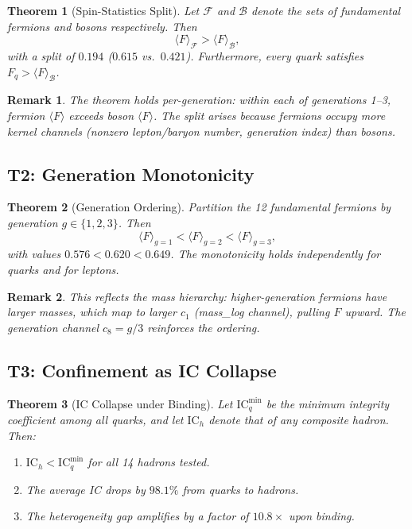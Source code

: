 \documentclass[
  aps,
  prd,
  twocolumn,
  superscriptaddress,
  nofootinbib,
  floatfix
]{revtex4-2}
\newtheorem{theorem}{Theorem}
\newtheorem{remark}{Remark}
\newcommand{\beq}{\begin{equation}}
\newcommand{\eeq}{\end{equation}}
\newcommand{\IC}{\mathrm{IC}}
\begin{document}
\begin{theorem}[Spin-Statistics Split]\label{thm:T1}
Let $\mathcal{F}$ and $\mathcal{B}$ denote the sets of
fundamental fermions and bosons respectively.  Then
\beq
  \langle F \rangle_{\mathcal{F}} > \langle F \rangle_{\mathcal{B}},
\eeq
with a split of $0.194$ ($0.615$ vs.\ $0.421$).  Furthermore,
every quark satisfies $F_q > \langle F \rangle_{\mathcal{B}}$.
\end{theorem}

\begin{remark}
The theorem holds per-generation: within each of generations 1--3,
fermion $\langle F \rangle$ exceeds boson $\langle F \rangle$.
The split arises because fermions occupy more kernel channels
(nonzero lepton/baryon number, generation index) than bosons.
\end{remark}

\subsection{T2: Generation Monotonicity}

\begin{theorem}[Generation Ordering]\label{thm:T2}
Partition the 12 fundamental fermions by generation $g \in \{1,2,3\}$.
Then
\beq
  \langle F \rangle_{g=1} < \langle F \rangle_{g=2} < \langle F \rangle_{g=3},
\eeq
with values $0.576 < 0.620 < 0.649$.  The monotonicity holds
independently for quarks and for leptons.
\end{theorem}

\begin{remark}
This reflects the mass hierarchy: higher-generation fermions
have larger masses, which map to larger $c_1$ (mass\_log channel),
pulling $F$ upward.  The generation channel $c_8 = g/3$ reinforces
the ordering.
\end{remark}

\subsection{T3: Confinement as IC Collapse}

\begin{theorem}[IC Collapse under Binding]\label{thm:T3}
Let $\IC_q^{\min}$ be the minimum integrity coefficient among
all quarks, and let $\IC_h$ denote that of any composite hadron.
Then:
\begin{enumerate}
\item $\IC_h < \IC_q^{\min}$ for all 14 hadrons tested.
\item The average IC drops by $98.1\%$ from quarks to hadrons.
\item The heterogeneity gap amplifies by a factor of $10.8\times$ upon
      binding.
\end{enumerate}
\end{theorem}
\end{document}
